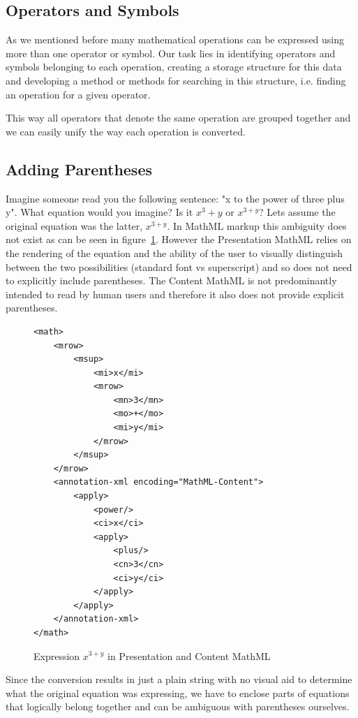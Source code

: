 \documentclass[11pt,oneside,final]{fithesis2}
\begin{document}
\subsection{Operators and Symbols}
As we mentioned before many mathematical operations can be expressed using more than one operator or symbol. Our task lies in identifying operators and symbols belonging to each operation, creating a storage structure for this data and developing a method or methods for searching in this structure, i.e. finding an operation for a given operator. 

This way all operators that denote the same operation are grouped together and we can easily unify the way each operation is converted.

\subsection{Adding Parentheses}
Imagine someone read you the following sentence: "x to the power of three plus y". What equation would you imagine? Is it $x^{3} + y$ or $x^{3+y}$? Lets assume the original equation was the latter, $x^{3+y}$. In MathML markup this ambiguity does not exist as can be seen in figure~\ref{fig:addingbraces}. However the Presentation MathML relies on the rendering of the equation and the ability of the user to visually distinguish between the two possibilities (standard font vs superscript) and so does not need to explicitly include parentheses. The Content MathML is not predominantly intended to read by human users and therefore it also does not provide explicit parentheses.

\begin{figure}[!ht]
\lstset{language=XML,frame=lines}
\begin{lstlisting}
<math>
	<mrow>
		<msup>
			<mi>x</mi>
			<mrow>
				<mn>3</mn>
				<mo>+</mo>
				<mi>y</mi>
			</mrow>
		</msup>
	</mrow>
	<annotation-xml encoding="MathML-Content">
		<apply>
			<power/>
			<ci>x</ci>
			<apply>
				<plus/>
				<cn>3</cn>
				<ci>y</ci>
			</apply>
		</apply>
	</annotation-xml>
</math>
\end{lstlisting}
\caption{Expression $x^{3+y}$ in Presentation and Content MathML}
\label{fig:addingbraces}
\end{figure}

Since the conversion results in just a plain string with no visual aid to determine what the original equation was expressing, we have to enclose parts of equations that logically belong together and can be ambiguous with parentheses ourselves. 
\end{document}
